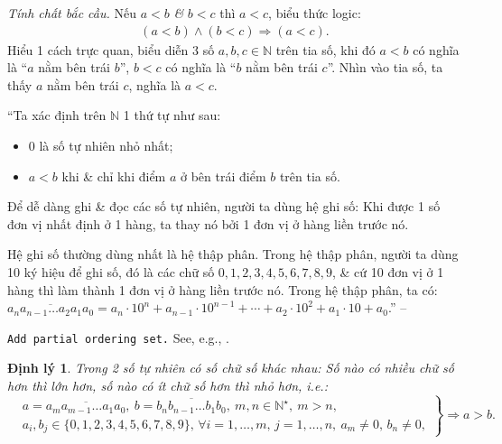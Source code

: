 \documentclass{article}
\numberwithin{equation}{section}
\newtheorem{dinhly}{Định lý}[section]
\begin{document}
\noindent\textit{Tính chất bắc cầu.} Nếu $a < b$ \textit{\&} $b < c$ thì $a < c$, biểu thức logic:
\begin{align*}
	(a < b)\land(b < c)\Rightarrow(a < c).
\end{align*}
Hiểu 1 cách trực quan, biểu diễn 3 số $a,b,c\in\mathbb{N}$ trên tia số, khi đó $a < b$ có nghĩa là ``$a$ nằm bên trái $b$'', $b < c$ có nghĩa là ``$b$ nằm bên trái $c$''. Nhìn vào tia số, ta thấy $a$ nằm bên trái $c$, nghĩa là $a < c$.

``Ta xác định trên $\mathbb{N}$ 1 thứ tự như sau:
\begin{itemize}
	\item 0 là số tự nhiên nhỏ nhất;
	\item $a < b$ khi \& chỉ khi điểm $a$ ở bên trái điểm $b$ trên tia số.
\end{itemize}
Để dễ dàng ghi \& đọc các số tự nhiên, người ta dùng hệ ghi số: Khi được 1 số đơn vị nhất định ở 1 hàng, ta thay nó bởi 1 đơn vị ở hàng liền trước nó.

Hệ ghi số thường dùng nhất là hệ thập phân. Trong hệ thập phân, người ta dùng 10 ký hiệu để ghi số, đó là các chữ số $0,1,2,3,4,5,6,7,8,9$, \& cứ 10 đơn vị ở 1 hàng thì làm thành 1 đơn vị ở hàng liền trước nó. Trong hệ thập phân, ta có: $\overline{a_na_{n-1}\ldots a_2a_1a_0} = a_n\cdot 10^n + a_{n-1}\cdot 10^{n-1} + \cdots + a_2\cdot 10^2 + a_1\cdot 10 + a_0$.'' -- \cite{Binh_Toan_6_tap_1}

\texttt{Add partial ordering set.} See, e.g., \cite{Halmos1960, Halmos1974, Kaplansky1972, Kaplansky1977}.

\begin{dinhly}
	Trong 2 số tự nhiên có số chữ số khác nhau: Số nào có nhiều chữ số hơn thì lớn hơn, số nào có ít chữ số hơn thì nhỏ hơn, i.e.:
	\begin{equation}
		\label{compare number of digits}
		\left.\begin{split}
			&a = \overline{a_ma_{m-1}\ldots a_1a_0},\ b = \overline{b_nb_{n-1}\ldots b_1b_0},\ m,n\in\mathbb{N}^\star,\ m > n,\\
			&a_i,b_j\in\{0,1,2,3,4,5,6,7,8,9\},\,\forall i = 1,\ldots,m,\,j = 1,\ldots,n,\ a_m\ne 0,\,b_n\ne 0,
		\end{split}\right\}\Rightarrow a > b.		
	\end{equation}
\end{dinhly}
\end{document}

